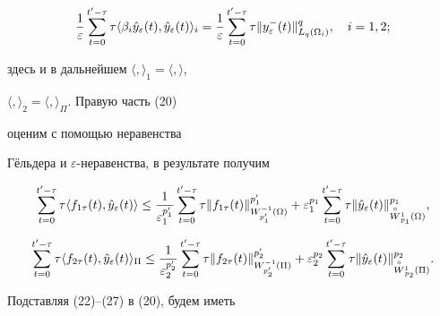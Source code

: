 \begin{pf}
\begin{equation} 


\frac{1}{\varepsilon} 


\sum^{t'-\tau}_{t=0}\tau\langle \beta_i \Hat y_\varepsilon(t), 


\Hat y_\varepsilon(t)\rangle_i = 


\frac{1}{\varepsilon} \sum^{t'-\tau}_{t=0}\tau 


\|y_\varepsilon^-(t)\|^q_{L_q(\Omega_i)}, \quad i=1,2; 


\end{equation} 


здесь и в дальнейшем $\langle,\rangle_1=\langle,\rangle$, 


$\langle,\rangle_2=\langle,\rangle_\Pi$. Правую часть (20) 


оценим с помощью неравенства 


Г\"ельдера и $\varepsilon$-неравенства, в результате получим 


\begin{equation} 


\sum^{t'-\tau}_{t=0}\tau\langle f_{1\tau}(t), \Hat y_\varepsilon(t) 


\rangle \le \frac{1}{\varepsilon^{p'_1}_1}


\sum^{t'-\tau}_{t=0}\tau\|f_{1\tau}(t)\|^{p'_1}_{W^{-1}_{p'_1}(\Omega)}+ 


\varepsilon^{p_1}_1 


\sum^{t'-\tau}_{t=0}\tau 


\|\Hat y_\varepsilon(t)\|^{p_1}_{\oc W{}^1_{p_1}(\Omega)}, 


\end{equation} 


% 


\begin{equation} 


\sum^{t'-\tau}_{t=0}\tau\langle f_{2\tau}(t), \Hat y_\varepsilon(t) 


\rangle_\Pi \le \frac{1}{\varepsilon^{p'_2}_2}


\sum^{t'-\tau}_{t=0}\tau\|f_{2\tau}(t)\|^{p'_2}_{W^{-1}_{p'_2}(\Pi)}+ 


\varepsilon^{p_2}_2 


\sum^{t'-\tau}_{t=0}\tau 


\|\Hat y_\varepsilon(t)\|^{p_2}_{\oc W{}^1_{p_2}(\Pi)}.


\end{equation} 


Подставляя (22)--(27) в (20), будем иметь 



\end{pf}
